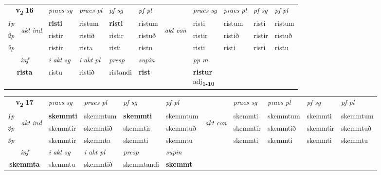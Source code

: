 \noindent
\begin{tabular}{lllllllllll} \toprule
\multicolumn{2}{c}{\textbf{v{\textsubscript{2}}} \Large{\textbf{16}}}  &  \textit{praes sg}  & \textit{praes pl}  &\textit{ pf sg} & \textit{pf pl} &  &  \textit{praes sg}  & \textit{praes pl}  & \textit{pf sg} & \textit{pf pl } \\*
	\cmidrule{3-6} \cmidrule{8-11}
 {\textit{1p}} & \multirow{3}{*}{\begin{turn}{90}\textit{akt ind}\end{turn}} & \textbf{risti} & ristum & \textbf{risti} & ristum & \multirow{3}{*}{\begin{turn}{90}\textit{akt con}\end{turn}} &risti & ristum & risti & ristum\\*
 {\textit{2p}} &  &  ristir  & ristið & ristir & ristuð & & ristir & ristið & ristir & ristuð \\*
{\textit{3p}} &  & ristir & rista & risti & ristu & & risti & risti& risti & ristu \\*
\cmidrule{3-6} \cmidrule{8-11}

   \multicolumn{2}{c}{\textit{inf}}  & \textit{i akt sg} & \textit{i akt pl}   & \textit{presp} & \textit{supin}  && \textit{pp m} \\*
  \multicolumn{2}{c}{\textbf{rista}} & ristu  & ristið   & ristandi &  \textbf{rist}  && \specialcell{\textbf{ristur} \\ adj\textbf{\textsubscript{1-10}}} \\*
\end{tabular}

\noindent
\begin{tabular}{lllllllllll} \toprule
\multicolumn{2}{c}{\textbf{v{\textsubscript{2}}} \Large{\textbf{17}}}  &  \textit{praes sg}  & \textit{praes pl}  &\textit{ pf sg} & \textit{pf pl} &  &  \textit{praes sg}  & \textit{praes pl}  & \textit{pf sg} & \textit{pf pl } \\*
	\cmidrule{3-6} \cmidrule{8-11}
 {\textit{1p}} & \multirow{3}{*}{\begin{turn}{90}\textit{akt ind}\end{turn}} & \textbf{skemmti} & skemmtum & \textbf{skemmti} & skemmtum & \multirow{3}{*}{\begin{turn}{90}\textit{akt con}\end{turn}} &skemmti & skemmtum & skemmti & skemmtum\\*
 {\textit{2p}} &  &  skemmtir  & skemmtið & skemmtir & skemmtuð & & skemmtir & skemmtið & skemmtir & skemmtuð \\*
{\textit{3p}} &  & skemmtir & skemmta & skemmti & skemmtu & & skemmti & skemmti& skemmti & skemmtu \\*
\cmidrule{3-6} \cmidrule{8-11}

   \multicolumn{2}{c}{\textit{inf}}  & \textit{i akt sg} & \textit{i akt pl}   & \textit{presp} & \textit{supin}   \\*
  \multicolumn{2}{c}{\textbf{skemmta}} & skemmtu  & skemmtið   & skemmtandi &  \textbf{skemmt}   \\*
\end{tabular}

